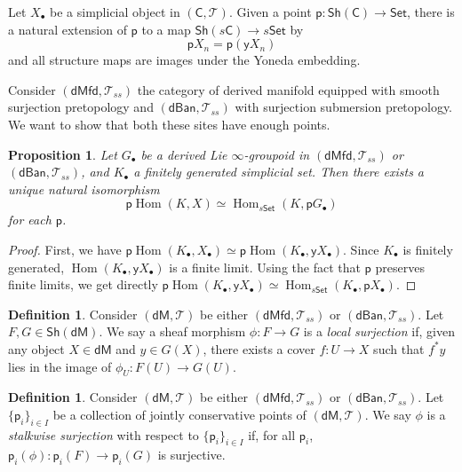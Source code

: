 \documentclass[12pt]{amsart}
\newtheorem{prop}[thm]{Proposition}
\theoremstyle{definition}
\newtheorem{defn}[thm]{Definition}
\theoremstyle{remark}
\numberwithin{equation}{section}
\newcommand{\CC}{{\mathsf C}}
\newcommand{\1}{{\mathbb{1}}}
\newcommand{\y}{\mathsf{y}}
\newcommand{\p}{\mathsf{p}}
\newcommand{\set}{\mathsf{Set}}
\newcommand{\dm}{\mathsf{dM}}
\newcommand{\dmfd}{\mathsf{dMfd}}
\newcommand{\dban}{\mathsf{dBan}}
\newcommand{\sh}{\mathsf{Sh}}
\newcommand{\bt}{\bullet}
\newcommand{\Hom}{\operatorname{Hom}}
\begin{document}
    Let $X_{\bt}$ be a simplicial object in $(\CC, \mathcal{T})$. Given a point $\p: \sh(\CC)\to \set$, there is a natural extension of $\p$ to a map $\sh(s\CC)\to s\set$ by
    \begin{equation*}
        \p X_n = \p(\y X_n)
    \end{equation*}
    and all structure maps are images under the Yoneda embedding.

Consider $(\dmfd, \mathcal{T}_{ss} )$ the category of derived manifold equipped with smooth surjection pretopology and $(\dban, \mathcal{T}_{ss} )$ with surjection submersion pretopology. We want to show that both these sites have enough points.

\begin{prop}
    Let $G_{\bt}$ be a derived Lie $\infty$-groupoid in $(\dmfd, \mathcal{T}_{ss} )$ or $(\dban, \mathcal{T}_{ss} )$, and $K_{\bt}$ a finitely generated simplicial set. Then there exists a unique natural isomorphism
    $$
        \p\Hom(K, X)\simeq \Hom_{s\set}(K, \p G_{\bt})
    $$
    for each $\p$.
\end{prop}
\begin{proof}
    First, we have $\p \Hom(K_{\bt}, X_{\bt}) \simeq \p\Hom(K_{\bt}, \y X_{\bt})$. Since $K_{\bt}$ is finitely generated, $\Hom(K_{\bt}, \y X_{\bt})$ is a finite limit. Using the fact that $\p$ preserves finite limits, we get directly $\p\Hom(K_{\bt}, \y X_{\bt}) \simeq \Hom_{s\set}(K_{\bt}, \p X_{\bt})$.
\end{proof}

\begin{defn}
    Consider $(\dm, \mathcal{T})$ be either $(\dmfd, \mathcal{T}_{ss} )$ or $(\dban, \mathcal{T}_{ss} )$. Let $F,G\in \sh(\dm)$. We say a sheaf morphism $\phi: F \to G$ is a {\it local surjection}  if, given any object $X\in \dm$ and $y\in G(X)$, there exists a cover $f: U\to X$ such that $f^*y$ lies in the image of $\phi_U: F(U)\to G(U)$. 
\end{defn}

\begin{defn}
Consider $(\dm, \mathcal{T})$ be either $(\dmfd, \mathcal{T}_{ss} )$ or $(\dban, \mathcal{T}_{ss} )$. Let $\{\p_i\}_{i\in I}$ be a collection of jointly conservative points of $(\dm, \mathcal{T})$. We say $\phi$ is a {\it stalkwise surjection} with respect to $\{\p_i\}_{i\in I}$ if, for all $\p_i$,
$\p_i(\phi): \p_i(F) \to \p_i(G)$ is surjective.
\end{defn}
\end{document}

